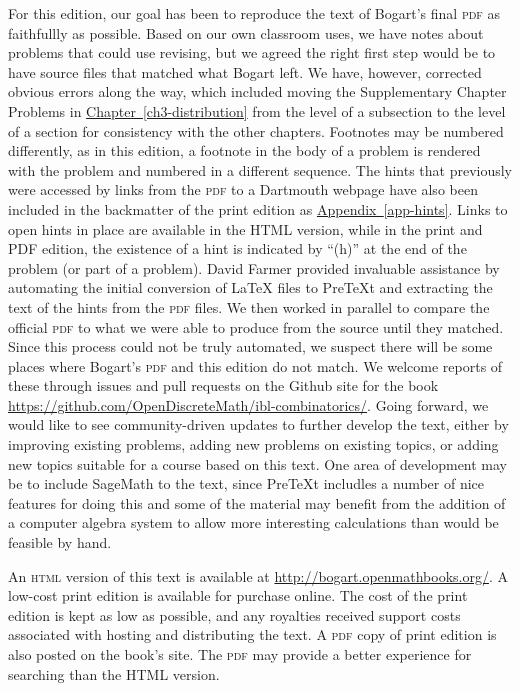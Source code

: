 \documentclass[10pt,]{book}
\newcommand{\initialism}[1]{\textsc{\MakeLowercase{#1}}}
\theoremstyle{plain}
\theoremstyle{definition}
\theoremstyle{definition}
\numberwithin{equation}{chapter}
\begin{document}
For this edition, our goal has been to reproduce the text of Bogart's final \initialism{PDF} as faithfullly as possible. Based on our own classroom uses, we have notes about problems that could use revising, but we agreed the right first step would be to have source files that matched what Bogart left. We have, however, corrected obvious errors along the way, which included moving the Supplementary Chapter Problems in \hyperref[ch3-distribution]{Chapter~\ref{ch3-distribution}} from the level of a subsection to the level of a section for consistency with the other chapters. Footnotes may be numbered differently, as in this edition, a footnote in the body of a problem is rendered with the problem and numbered in a different sequence. The hints that previously were accessed by links from the \initialism{PDF} to a Dartmouth webpage have also been included in the backmatter of the print edition as \hyperref[app-hints]{Appendix~\ref{app-hints}}. Links to open hints in place are available in the HTML version, while in the print and PDF edition, the existence of a hint is indicated by ``(h)'' at the end of the problem (or part of a problem). David Farmer provided invaluable assistance by automating the initial conversion of \LaTeX{} files to PreTeXt and extracting the text of the hints from the \initialism{PDF} files. We then worked in parallel to compare the official \initialism{PDF} to what we were able to produce from the source until they matched. Since this process could not be truly automated, we suspect there will be some places where Bogart's \initialism{PDF} and this edition do not match. We welcome reports of these through issues and pull requests on the Github site for the book \url{https://github.com/OpenDiscreteMath/ibl-combinatorics/}. Going forward, we would like to see community-driven updates to further develop the text, either by improving existing problems, adding new problems on existing topics, or adding new topics suitable for a course based on this text. One area of development may be to include SageMath to the text, since PreTeXt includles a number of nice features for doing this and some of the material may benefit from the addition of a computer algebra system to allow more interesting calculations than would be feasible by hand.%
\par
\hypertarget{p-25}{}%
An \initialism{HTML} version of this text is available at \url{http://bogart.openmathbooks.org/}. A low-cost print edition is available for purchase online. The cost of the print edition is kept as low as possible, and any royalties received support costs associated with hosting and distributing the text. A \initialism{PDF} copy of print edition is also posted on the book's site. The \initialism{PDF} may provide a better experience for searching than the HTML version.%
\end{document}
